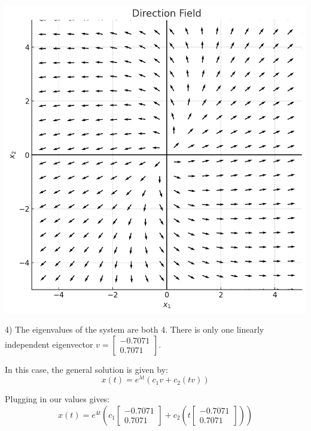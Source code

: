 \documentclass{article}
\begin{document}
\includegraphics[width=\linewidth]{5_5_2_direction_field}


4) The eigenvalues of the system are both 4. There is only one linearly
independent eigenvector $v = \begin{bmatrix}
    -0.7071 \\
    0.7071
\end{bmatrix}$.

In this case, the general solution is given by:
\[x(t) = e^{\lambda t} (c_1 v + c_2 (t v))\]

Plugging in our values gives:
\[x(t) = e^{4t} (c_1 \begin{bmatrix}
    -0.7071 \\
    0.7071
\end{bmatrix} + c_2 (t \begin{bmatrix}
    -0.7071 \\
    0.7071
\end{bmatrix}))\]
\end{document}
